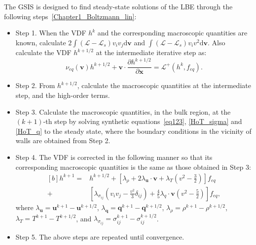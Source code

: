 The GSIS is designed to find steady-state solutions of the LBE through the following steps~\eqref{Chapter1_Boltzmann_lin}:
\begin{itemize}
	\item Step 1. When the VDF $h^{k}$ and the corresponding macroscopic quantities are known,  calculate $2\int{(\mathcal{L}-\mathcal{L}_s)v_iv_j}\mathrm{d}\bm{v}$  and $\int{(\mathcal{L}-\mathcal{L}_s)v_iv^2}\mathrm{d}\bm{v}$. Also calculate the VDF $h^{k+1/2}$ at the intermediate iterative step  as: 
	\begin{equation}\label{syn_LBE0}
	\nu_{eq}(\bm{v})h^{k+1/2}+\bm{v}\cdot\frac{\partial
		{h}^{k+1/2}}{\partial{\bm{x}}}=\mathcal{L}^+(h^{k},f_{eq}).
	\end{equation}

	\item Step 2. From $h^{k+1/2}$, calculate the macroscopic quantities at the intermediate step, and the high-order terms.
	
	\item Step 3. Calculate the macroscopic quantities, in the bulk region, at the $(k+1)$-th step by solving synthetic equations~\eqref{eq123}, \eqref{HoT_sigma} and \eqref{HoT_q} to the steady state, where the boundary conditions in the vicinity of walls are obtained from Step 2.
	
	
	
	\item  Step 4. The VDF is corrected in the following manner so that its corresponding macroscopic quantities is the same as those obtained in Step 3:
	\begin{equation}\label{guided0}
	\begin{aligned}[b]
	h^{k+1}=&h^{k+1/2}+\left[\lambda_{\rho}
	+2\lambda_{\bm{u}}\cdot{\bm{v}}+\lambda_T\left(v^2-\frac{3}{2}\right)
\right]f_{eq}\\
	+&\left[
	\lambda_{\sigma_{ij}}\left(v_iv_j-\frac{v^2}{3}\delta_{ij}\right)
	+\frac{4}{5}{\lambda_q}\cdot\bm{v}\left(v^2-\frac{5}{2}\right)
		\right]f_{eq},
	\end{aligned}
	\end{equation}
	where $\lambda_{\bm{u}}=\bm{u}^{k+1}-\bm{u}^{k+1/2}$, $\lambda_{\bm{q}}=\bm{q}^{k+1}-\bm{q}^{k+1/2}$, $\lambda_{\rho}=\rho^{k+1}-\rho^{k+1/2}$,  $\lambda_T=T^{k+1}-T^{k+1/2}$, and $\lambda_{\sigma_{ij}}=\sigma_{ij}^{k+1}-\sigma_{ij}^{k+1/2}$.
	
	\item Step 5. The above steps are repeated until convergence.
\end{itemize}




